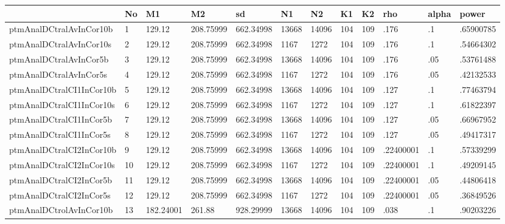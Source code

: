 \begin{tabular}{|l|l|l|l|l|l|l|l|l|l|l|l|}\hline  
 & No  & M1  & M2  & sd  & N1  & N2  & K1  & K2  & rho  & alpha  & power  \\ \hline  
ptmAnalDCtralAvInCor10b & 1 & 129.12 & 208.75999 & 662.34998 & 13668 & 14096 & 104 & 109 & .176 & .1 & .65900785 \\ \hline 
ptmAnalDCtralAvInCor10s & 2 & 129.12 & 208.75999 & 662.34998 & 1167 & 1272 & 104 & 109 & .176 & .1 & .54664302 \\ \hline 
ptmAnalDCtralAvInCor5b & 3 & 129.12 & 208.75999 & 662.34998 & 13668 & 14096 & 104 & 109 & .176 & .05 & .53761488 \\ \hline 
ptmAnalDCtralAvInCor5s & 4 & 129.12 & 208.75999 & 662.34998 & 1167 & 1272 & 104 & 109 & .176 & .05 & .42132533 \\ \hline 
ptmAnalDCtralCI1InCor10b & 5 & 129.12 & 208.75999 & 662.34998 & 13668 & 14096 & 104 & 109 & .127 & .1 & .77463794 \\ \hline 
ptmAnalDCtralCI1InCor10s & 6 & 129.12 & 208.75999 & 662.34998 & 1167 & 1272 & 104 & 109 & .127 & .1 & .61822397 \\ \hline 
ptmAnalDCtralCI1InCor5b & 7 & 129.12 & 208.75999 & 662.34998 & 13668 & 14096 & 104 & 109 & .127 & .05 & .66967952 \\ \hline 
ptmAnalDCtralCI1InCor5s & 8 & 129.12 & 208.75999 & 662.34998 & 1167 & 1272 & 104 & 109 & .127 & .05 & .49417317 \\ \hline 
ptmAnalDCtralCI2InCor10b & 9 & 129.12 & 208.75999 & 662.34998 & 13668 & 14096 & 104 & 109 & .22400001 & .1 & .57339299 \\ \hline 
ptmAnalDCtralCI2InCor10s & 10 & 129.12 & 208.75999 & 662.34998 & 1167 & 1272 & 104 & 109 & .22400001 & .1 & .49209145 \\ \hline 
ptmAnalDCtralCI2InCor5b & 11 & 129.12 & 208.75999 & 662.34998 & 13668 & 14096 & 104 & 109 & .22400001 & .05 & .44806418 \\ \hline 
ptmAnalDCtralCI2InCor5s & 12 & 129.12 & 208.75999 & 662.34998 & 1167 & 1272 & 104 & 109 & .22400001 & .05 & .36849526 \\ \hline 
ptmAnalDCtrolAvInCor10b & 13 & 182.24001 & 261.88 & 928.29999 & 13668 & 14096 & 104 & 109 & .038 & .1 & .90203226 \\ \hline 

\end{tabular}
